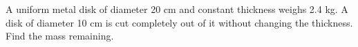 A uniform metal disk of diameter 20 cm and constant thickness weighs 2.4 kg. A disk of diameter 10 cm is cut completely out of it without changing the thickness. Find the mass remaining.
